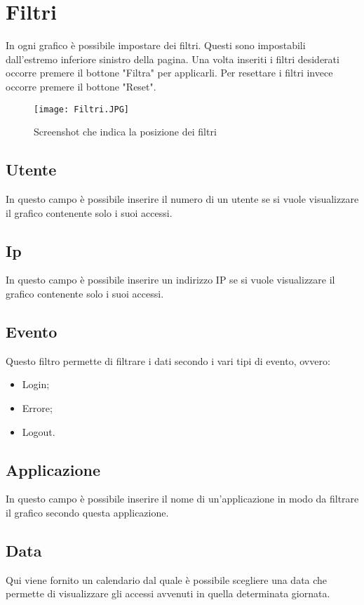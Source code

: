 \section{Filtri}
In ogni grafico è possibile impostare dei filtri. Questi sono impostabili dall'estremo inferiore sinistro della pagina. Una volta inseriti i filtri desiderati occorre premere il bottone "Filtra" per applicarli. Per resettare i filtri invece occorre premere il bottone "Reset".

\begin{figure}[H]
    \texttt{[image: Filtri.JPG]}
    \caption{Screenshot che indica la posizione dei filtri}
\end{figure}

\subsection{Utente}
In questo campo è possibile inserire il numero di un utente se si vuole visualizzare il grafico contenente solo i suoi accessi.

\subsection{Ip}
In questo campo è possibile inserire un indirizzo IP se si vuole visualizzare il grafico contenente solo i suoi accessi.

\subsection{Evento}
Questo filtro permette di filtrare i dati secondo i vari tipi di evento, ovvero:
\begin{itemize}
  \item Login;
  \item Errore;
  \item Logout.
\end{itemize}

\subsection{Applicazione}
In questo campo è possibile inserire il nome di un'applicazione in modo da filtrare il grafico secondo questa applicazione.

\subsection{Data}
Qui viene fornito un calendario dal quale è possibile scegliere una data che permette di visualizzare gli accessi avvenuti in quella determinata giornata.

